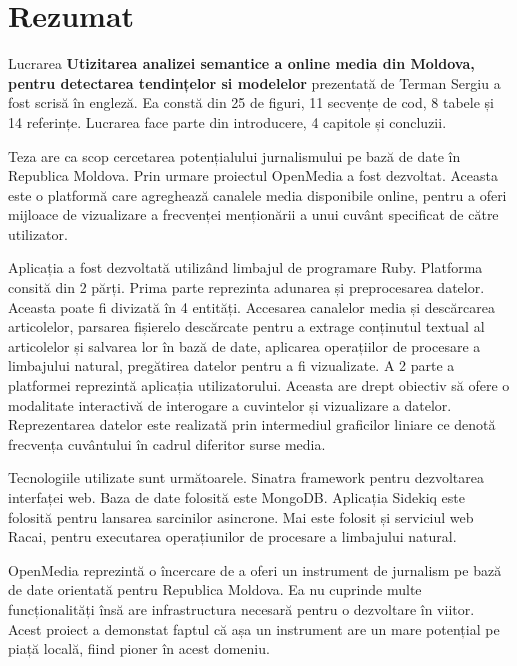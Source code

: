 \section*{Rezumat}
Lucrarea \textbf{Utizitarea analizei semantice a online media din Moldova, pentru detectarea tendințelor si modelelor} prezentată de Terman Sergiu a fost scrisă în engleză. Ea constă din 25 de figuri, 11 secvențe de cod, 8 tabele și 14 referințe. Lucrarea face parte din introducere, 4 capitole și concluzii.

Teza are ca scop cercetarea potențialului jurnalismului pe bază de date în Republica Moldova. Prin urmare proiectul OpenMedia a fost dezvoltat. Aceasta este o platformă care agreghează canalele media disponibile online, pentru a oferi mijloace de vizualizare a frecvenței menționării a unui cuvânt specificat de către utilizator.

Aplicația a fost dezvoltată utilizând limbajul de programare Ruby. Platforma consită din 2 părți. Prima parte reprezinta adunarea și preprocesarea datelor. Aceasta poate fi divizată în 4 entități. Accesarea canalelor media și descărcarea articolelor, parsarea fișierelo descărcate pentru a extrage conținutul textual al articolelor și salvarea lor în bază de date, aplicarea operațiilor de procesare a limbajului natural, pregătirea datelor pentru a fi vizualizate. A 2 parte a platformei reprezintă aplicația utilizatorului. Aceasta are drept obiectiv să ofere o modalitate interactivă de interogare a cuvintelor și vizualizare a datelor. Reprezentarea datelor este realizată prin intermediul graficilor liniare ce denotă frecvența cuvântului în cadrul diferitor surse media.

Tecnologiile utilizate sunt următoarele. Sinatra framework pentru dezvoltarea interfaței web. Baza de date folosită este MongoDB. Aplicația Sidekiq este folosită pentru lansarea sarcinilor asincrone. Mai este folosit și serviciul web Racai, pentru executarea operațiunilor de procesare a limbajului natural.


OpenMedia reprezintă o încercare de a oferi un instrument de jurnalism pe bază de date orientată pentru Republica Moldova. Ea nu cuprinde multe funcționalități însă are infrastructura necesară pentru o dezvoltare în viitor. Acest proiect a demonstat faptul că așa un instrument are un mare potențial pe piață locală, fiind pioner în acest domeniu.
